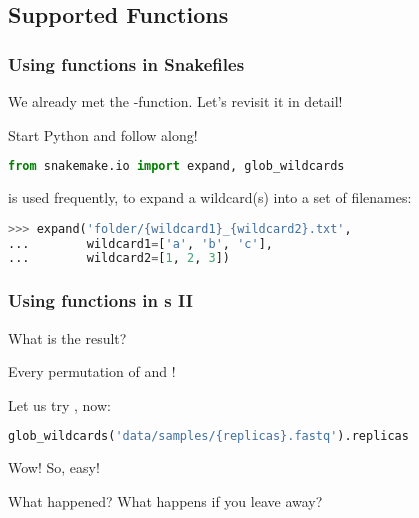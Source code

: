 \subsection{Supported Functions}

\begin{frame}[fragile]
  \frametitle{Using functions in Snakefiles}
  We already met the -function. Let's revisit it in detail!
  \begin{task}
  	Start Python and follow along!
  \end{task}
  \begin{lstlisting}[language=Python,style=Python]
from snakemake.io import expand, glob_wildcards
  \end{lstlisting}
    is used frequently, to expand a \Snakemake{} wildcard(s) into a set of filenames:
  \begin{lstlisting}[language=Python,style=Python]
>>> expand('folder/{wildcard1}_{wildcard2}.txt',
...        wildcard1=['a', 'b', 'c'],
...        wildcard2=[1, 2, 3])
  \end{lstlisting}
\end{frame}

\begin{frame}[fragile]
  \frametitle{Using functions in s II}
  \begin{question}
  	What is the result?
  \end{question}
  \pause
  \begin{hint}[Answer:]
  	Every permutation of  and !
  \end{hint}
  \pause
  Let us try , now:
  \begin{lstlisting}[language=Python,style=Python]
glob_wildcards('data/samples/{replicas}.fastq').replicas
  \end{lstlisting}
  \pause
  Wow! So, easy!
  \begin{question}
  	What happened? What happens if you leave  away?
  \end{question}
\end{frame}

